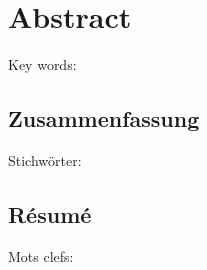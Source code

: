 

\cleardoublepage
\chapter*{Abstract}
\lipsum[1-2]
\vskip0.5cm
Key words: 


\begin{otherlanguage}{german}
\cleardoublepage
\chapter*{Zusammenfassung}
\lipsum[1-2]
\vskip0.5cm
Stichwörter: 
\end{otherlanguage}




\begin{otherlanguage}{french}
\cleardoublepage
\chapter*{Résumé}
\lipsum[1-2]
\vskip0.5cm
Mots clefs: 
\end{otherlanguage}


